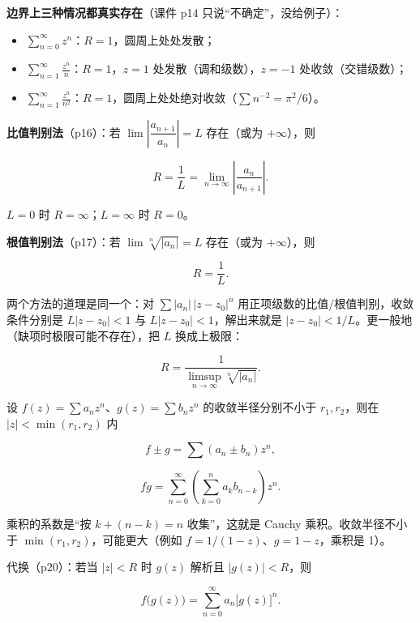 \documentclass[11pt]{ctexart}
\let\origsubhdr\subhdr
\renewcommand{\subhdr}[1]{\par\needspace{4\baselineskip}\origsubhdr{#1}}
\begin{document}
\textbf{边界上三种情况都真实存在}（课件 p14 只说“不确定”，没给例子）：

\begin{itemize}
\item $\displaystyle\sum_{n=0}^{\infty}z^n$：$R=1$，圆周上处处发散；
\item $\displaystyle\sum_{n=1}^{\infty}\frac{z^n}{n}$：$R=1$，$z=1$ 处发散（调和级数），$z=-1$ 处收敛（交错级数）；
\item $\displaystyle\sum_{n=1}^{\infty}\frac{z^n}{n^2}$：$R=1$，圆周上处处绝对收敛（$\sum n^{-2}=\pi^2/6$）。
\end{itemize}


\textbf{比值判别法}（p16）：若 $\lim\left|\dfrac{a_{n+1}}{a_n}\right|=L$ 存在（或为 $+\infty$），则

\[ R=\frac{1}{L}=\lim_{n\to\infty}\left|\frac{a_n}{a_{n+1}}\right| . \]

$L=0$ 时 $R=\infty$；$L=\infty$ 时 $R=0$。

\textbf{根值判别法}（p17）：若 $\lim\sqrt[n]{|a_n|}=L$ 存在（或为 $+\infty$），则

\[ R=\frac{1}{L} . \]

两个方法的道理是同一个：对 $\sum|a_n|\,|z-z_0|^n$ 用正项级数的比值/根值判别，收敛条件分别是 $L|z-z_0|<1$ 与 $L|z-z_0|<1$，解出来就是 $|z-z_0|<1/L$。更一般地（缺项时极限可能不存在），把 $L$ 换成上极限：

\[ R=\frac{1}{\limsup_{n\to\infty}\sqrt[n]{|a_n|}} . \]



设 $f(z)=\sum a_nz^n$、$g(z)=\sum b_nz^n$ 的收敛半径分别不小于 $r_1,r_2$，则在 $|z|<\min(r_1,r_2)$ 内

\[ f\pm g=\sum(a_n\pm b_n)z^n , \]

\[ fg=\sum_{n=0}^{\infty}\left(\sum_{k=0}^{n}a_kb_{n-k}\right)z^n . \]

乘积的系数是“按 $k+(n-k)=n$ 收集”，这就是 Cauchy 乘积。收敛半径不小于 $\min(r_1,r_2)$，可能更大（例如 $f=1/(1-z)$、$g=1-z$，乘积是 1）。

代换（p20）：若当 $|z|<R$ 时 $g(z)$ 解析且 $|g(z)|<R$，则

\[ f\bigl(g(z)\bigr)=\sum_{n=0}^{\infty}a_n\bigl[g(z)\bigr]^n . \]
\end{document}

